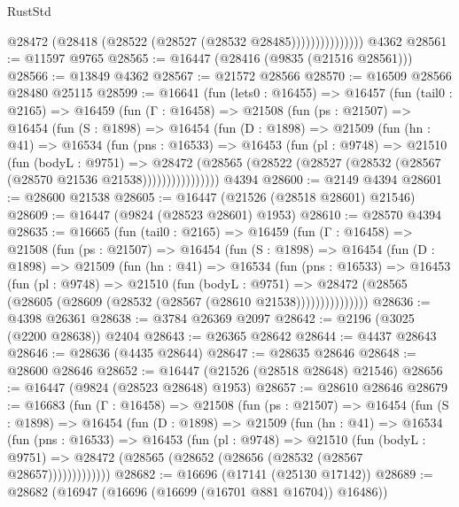 \begin{lexlean}{RustStd}
\begin{coremodule}
                        @28472 (@28418 (@28522 (@28527 (@28532 @28485)))))))))))))))
    @4362
@28561 := @11597 @9765
@28565 := @16447 (@28416 (@9835 (@21516 @28561)))
@28566 := @13849 @4362
@28567 := @21572 @28566
@28570 := @16509 @28566 @28480 @25115
@28599 := @16641
    (fun (lets0 : @16455) =>
    @16457
      (fun (tail0 : @2165) =>
      @16459
        (fun (Γ : @16458) =>
        @21508
          (fun (ps : @21507) =>
          @16454
            (fun (S : @1898) =>
            @16454
              (fun (D : @1898) =>
              @21509
                (fun (hn : @41) =>
                @16534
                  (fun (pns : @16533) =>
                  @16453
                    (fun (pl : @9748) =>
                    @21510
                      (fun (bodyL : @9751) =>
                      @28472
                        (@28565
                          (@28522 (@28527 (@28532 (@28567 (@28570 @21536 @21538))))))))))))))))
    @4394
@28600 := @2149 @4394
@28601 := @28600 @21538
@28605 := @16447 (@21526 (@28518 @28601) @21546)
@28609 := @16447 (@9824 (@28523 @28601) @1953)
@28610 := @28570 @4394
@28635 := @16665
    (fun (tail0 : @2165) =>
    @16459
      (fun (Γ : @16458) =>
      @21508
        (fun (ps : @21507) =>
        @16454
          (fun (S : @1898) =>
          @16454
            (fun (D : @1898) =>
            @21509
              (fun (hn : @41) =>
              @16534
                (fun (pns : @16533) =>
                @16453
                  (fun (pl : @9748) =>
                  @21510
                    (fun (bodyL : @9751) =>
                    @28472 (@28565 (@28605 (@28609 (@28532 (@28567 (@28610 @21538)))))))))))))))
@28636 := @4398 @26361
@28638 := @3784 @26369 @2097
@28642 := @2196 (@3025 (@2200 @28638)) @2404
@28643 := @26365 @28642
@28644 := @4437 @28643
@28646 := @28636 (@4435 @28644)
@28647 := @28635 @28646
@28648 := @28600 @28646
@28652 := @16447 (@21526 (@28518 @28648) @21546)
@28656 := @16447 (@9824 (@28523 @28648) @1953)
@28657 := @28610 @28646
@28679 := @16683
    (fun (Γ : @16458) =>
    @21508
      (fun (ps : @21507) =>
      @16454
        (fun (S : @1898) =>
        @16454
          (fun (D : @1898) =>
          @21509
            (fun (hn : @41) =>
            @16534
              (fun (pns : @16533) =>
              @16453
                (fun (pl : @9748) =>
                @21510
                  (fun (bodyL : @9751) =>
                  @28472 (@28565 (@28652 (@28656 (@28532 (@28567 @28657)))))))))))))
@28682 := @16696 (@17141 (@25130 @17142))
@28689 := @28682 (@16947 (@16696 (@16699 (@16701 @881 @16704)) @16486))

\end{coremodule}
\end{lexlean}
